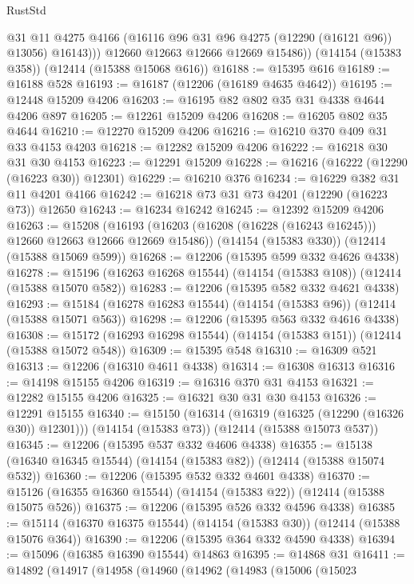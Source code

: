 \begin{lexlean}{RustStd}
\begin{coremodule}
              @31
              @11
              @4275
              @4166
              (@16116 @96 @31 @96 @4275 (@12290 (@16121 @96)) @13056)
              @16143)))
        @12660
        @12663
        @12666
        @12669
        @15486))
    (@14154 (@15383 @358))
    (@12414 (@15388 @15068 @616))
@16188 := @15395 @616
@16189 := @16188 @528
@16193 := @16187 (@12206 (@16189 @4635 @4642))
@16195 := @12448 @15209 @4206
@16203 := @16195 @82 @802 @35 @31 @4338 @4644 @4206 @897
@16205 := @12261 @15209 @4206
@16208 := @16205 @802 @35 @4644
@16210 := @12270 @15209 @4206
@16216 := @16210 @370 @409 @31 @33 @4153 @4203
@16218 := @12282 @15209 @4206
@16222 := @16218 @30 @31 @30 @4153
@16223 := @12291 @15209
@16228 := @16216 (@16222 (@12290 (@16223 @30)) @12301)
@16229 := @16210 @376
@16234 := @16229 @382 @31 @11 @4201 @4166
@16242 := @16218 @73 @31 @73 @4201 (@12290 (@16223 @73)) @12650
@16243 := @16234 @16242
@16245 := @12392 @15209 @4206
@16263 := @15208
    (@16193 (@16203 (@16208 (@16228 (@16243 @16245))) @12660 @12663 @12666 @12669 @15486))
    (@14154 (@15383 @330))
    (@12414 (@15388 @15069 @599))
@16268 := @12206 (@15395 @599 @332 @4626 @4338)
@16278 := @15196 (@16263 @16268 @15544) (@14154 (@15383 @108)) (@12414 (@15388 @15070 @582))
@16283 := @12206 (@15395 @582 @332 @4621 @4338)
@16293 := @15184 (@16278 @16283 @15544) (@14154 (@15383 @96)) (@12414 (@15388 @15071 @563))
@16298 := @12206 (@15395 @563 @332 @4616 @4338)
@16308 := @15172 (@16293 @16298 @15544) (@14154 (@15383 @151)) (@12414 (@15388 @15072 @548))
@16309 := @15395 @548
@16310 := @16309 @521
@16313 := @12206 (@16310 @4611 @4338)
@16314 := @16308 @16313
@16316 := @14198 @15155 @4206
@16319 := @16316 @370 @31 @4153
@16321 := @12282 @15155 @4206
@16325 := @16321 @30 @31 @30 @4153
@16326 := @12291 @15155
@16340 := @15150
    (@16314 (@16319 (@16325 (@12290 (@16326 @30)) @12301)))
    (@14154 (@15383 @73))
    (@12414 (@15388 @15073 @537))
@16345 := @12206 (@15395 @537 @332 @4606 @4338)
@16355 := @15138 (@16340 @16345 @15544) (@14154 (@15383 @82)) (@12414 (@15388 @15074 @532))
@16360 := @12206 (@15395 @532 @332 @4601 @4338)
@16370 := @15126 (@16355 @16360 @15544) (@14154 (@15383 @22)) (@12414 (@15388 @15075 @526))
@16375 := @12206 (@15395 @526 @332 @4596 @4338)
@16385 := @15114 (@16370 @16375 @15544) (@14154 (@15383 @30)) (@12414 (@15388 @15076 @364))
@16390 := @12206 (@15395 @364 @332 @4590 @4338)
@16394 := @15096 (@16385 @16390 @15544) @14863
@16395 := @14868 @31
@16411 := @14892
    (@14917
      (@14958
        (@14960
          (@14962
            (@14983
              (@15006
                (@15023

\end{coremodule}
\end{lexlean}
